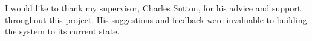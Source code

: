 \begin{acknowledgements}
I would like to thank my supervisor, Charles Sutton, for his advice and support throughout this project. His suggestions and feedback were invaluable to building the system to its current state.
\end{acknowledgements}